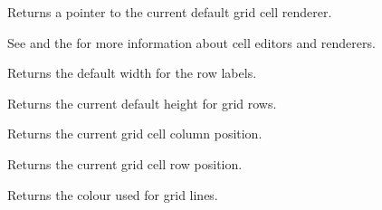 
Returns a pointer to the current default grid cell renderer.

See  and
the  for more information about cell editors and renderers.



\label{wxgridgetdefaultrendererforcell}




\label{wxgridgetdefaultrendererfortype}




\label{wxgridgetdefaultrowlabelsize}


Returns the default width for the row labels.



\label{wxgridgetdefaultrowsize}


Returns the current default height for grid rows.



\label{wxgridgetgridcursorcol}


Returns the current grid cell column position.



\label{wxgridgetgridcursorrow}


Returns the current grid cell row position.



\label{wxgridgetgridlinecolour}


Returns the colour used for grid lines.


